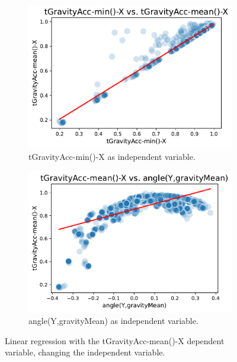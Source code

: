 \documentclass[10pt, a4paper, twocolumn]{article}
\begin{document}
\begin{figure}
    \centering
    \begin{subfigure}[t]{0.48\columnwidth}
    \includegraphics[width=\linewidth]{immagini Lia/linear regression lineare.pdf}
    \caption{tGravityAcc-min()-X as independent variable.}
    \label{fig:linear}
\end{subfigure}
\hfill
\begin{subfigure}[t]{0.49\columnwidth}
    \includegraphics[width=\linewidth]{immagini Lia/linear regression parabolica.pdf}
    \caption{angle(Y,gravityMean) as independent variable.}
    \label{fig:parabolic}
\end{subfigure}
\caption{Linear regression with the tGravityAcc-mean()-X dependent variable, changing the independent variable.}
\label{fig:linearregression}
\end{figure}
\end{document}
